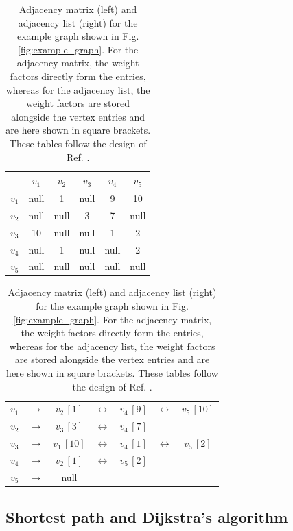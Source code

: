 \begin{table}[h]
	\centering
	\begin{tabular}{|c|ccccc|}
			\hline
			      & $v_1$ & $v_2$ & $v_3$ & $v_4$ & $v_5$ \tabularnewline
			\hline
			$v_1$ &  null &     1 &  null &     9 &    10 \tabularnewline
			$v_2$ &  null &  null &     3 &     7 &  null \tabularnewline
			$v_3$ &    10 &  null &  null &     1 &     2 \tabularnewline
			$v_4$ &  null &     1 &  null &  null &     2 \tabularnewline
			$v_5$ &  null &  null &  null &  null &  null \tabularnewline
			\hline
	\end{tabular}
	\hspace{1cm}
	\begin{tabular}{|c|c|ccccc|}
			\cline{1-1} \cline{3-7}
			$v_1$ &  $\rightarrow$ &  $v_2\, [1]$ &  $\leftrightarrow$ &  $v_4\, [9]$ &  $\leftrightarrow$  & $v_5\, [10]$ \tabularnewline
			\cline{1-1} \cline{3-7}
			$v_2$ &  $\rightarrow$ &  $v_3\, [3]$ &  $\leftrightarrow$ &  $v_4\, [7]$ &   &  \tabularnewline
			\cline{1-1} \cline{3-7}
			$v_3$ &  $\rightarrow$ &  $v_1\, [10]$ &  $\leftrightarrow$ &  $v_4\, [1]$ &  $\leftrightarrow$  & $v_5\, [2]$ \tabularnewline
			\cline{1-1} \cline{3-7}
			$v_4$ &  $\rightarrow$ &  $v_2\, [1]$ & $\leftrightarrow$  &  $v_5\, [2]$ &   &  \tabularnewline
			\cline{1-1} \cline{3-7}
			$v_5$ &  $\rightarrow$ & null &   &   &   &  \tabularnewline
			\cline{1-1} \cline{3-7}
	\end{tabular}
	\caption[Adjacency matrix and list.]{
		Adjacency matrix (left) and adjacency list (right) for the example graph shown in Fig. \ref{fig:example_graph}.
		For the adjacency matrix, the weight factors directly form the entries, whereas for the adjacency list, 
		the weight factors are stored alongside the vertex entries and are here shown in square brackets.
		These tables follow the design of Ref. \cite[pp. 4, table 4.1]{FUH_algo_graphs_2021}.}
	\label{tab:example_graph_structure}
\end{table}



\subsection{Shortest path and Dijkstra's algorithm}
\label{sec:dijkstra}
